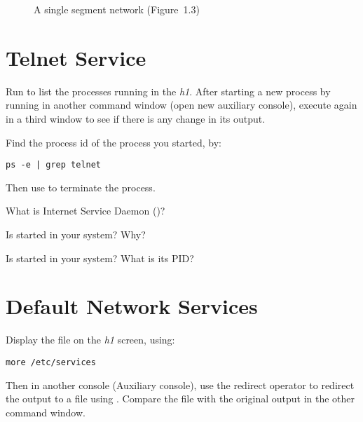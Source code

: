 \documentclass{../UTNetLab}
\begin{document}
\begin{center}
\begin{minipage}{0.48\textwidth}
\begin{flushright}
\begin{figure}[H]
                \caption{A single segment network (Figure~1.3)}
            \end{figure}
        \end{flushright}
    \end{minipage}
\end{center}

\section{Telnet Service}
Run  to list the processes running in the \textit{h1}.
After starting a new process by running  in another command window (open new auxiliary console), execute  again in a third window to see if there is any change in its output.

Find the process id of the  process you started, by:
\begin{lstlisting}
ps -e | grep telnet
    \end{lstlisting}
Then use  to terminate the  process.

\begin{report}
    \item What is Internet Service Daemon ()?

    \item Is  started in your system? Why?

    \item Is  started in your system? What is its PID?
\end{report}

\section{Default Network Services}
Display the file  on the \textit{h1} screen, using:
\begin{lstlisting}
more /etc/services
    \end{lstlisting}
Then in another console (Auxiliary console), use the redirect operator to redirect the  output to
a file using .
Compare the file  with the original  output in the other command window.
\end{document}
